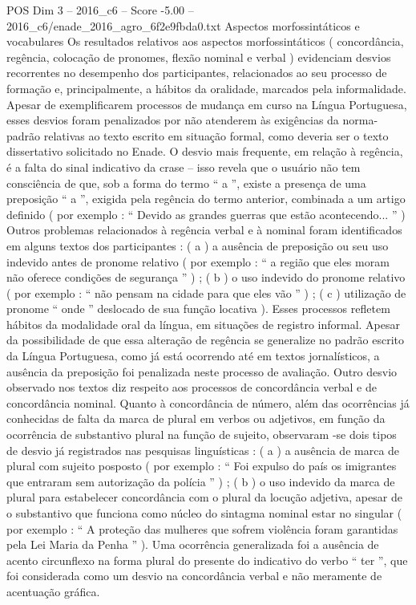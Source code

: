 \begin{textsample}{POS Dim 3 – 2016\_c6 – Score -5.00 – 2016\_c6/enade\_2016\_agro\_6f2e9fbda0.txt}
Aspectos morfossintáticos e vocabulares Os resultados relativos aos aspectos morfossintáticos ( concordância, regência, colocação de pronomes, flexão nominal e verbal ) evidenciam desvios recorrentes no desempenho dos participantes, relacionados ao seu processo de formação e, principalmente, a hábitos da oralidade, marcados pela informalidade.
Apesar de exemplificarem processos de mudança em curso na Língua Portuguesa, esses desvios foram penalizados por não atenderem às exigências da norma-padrão relativas ao texto escrito em situação formal, como deveria ser o texto dissertativo solicitado no Enade.
O desvio mais frequente, em relação à regência, é a falta do sinal indicativo da crase – isso revela que o usuário não tem consciência de que, sob a forma do termo “ a ”, existe a presença de uma preposição “ a ”, exigida pela regência do termo anterior, combinada a um artigo definido ( por exemplo : “ Devido as grandes guerras que estão acontecendo... ” ) Outros problemas relacionados à regência verbal e à nominal foram identificados em alguns textos dos participantes : ( a ) a ausência de preposição ou seu uso indevido antes de pronome relativo ( por exemplo : “ a região que eles moram não oferece condições de segurança ” ) ; ( b ) o uso indevido do pronome relativo ( por exemplo : “ não pensam na cidade para que eles vão ” ) ; ( c ) utilização de pronome “ onde ” deslocado de sua função locativa ).
Esses processos refletem hábitos da modalidade oral da língua, em situações de registro informal.
Apesar da possibilidade de que essa alteração de regência se generalize no padrão escrito da Língua Portuguesa, como já está ocorrendo até em textos jornalísticos, a ausência da preposição foi penalizada neste processo de avaliação.
Outro desvio observado nos textos diz respeito aos processos de concordância verbal e de concordância nominal.
Quanto à concordância de número, além das ocorrências já conhecidas de falta da marca de plural em verbos ou adjetivos, em função da ocorrência de substantivo plural na função de sujeito, observaram -se dois tipos de desvio já registrados nas pesquisas linguísticas : ( a ) a ausência de marca de plural com sujeito posposto ( por exemplo : “ Foi expulso do país os imigrantes que entraram sem autorização da polícia ” ) ; ( b ) o uso indevido da marca de plural para estabelecer concordância com o plural da locução adjetiva, apesar de o substantivo que funciona como núcleo do sintagma nominal estar no singular ( por exemplo : “ A proteção das mulheres que sofrem violência foram garantidas pela Lei Maria da Penha ” ).
Uma ocorrência generalizada foi a ausência de acento circunflexo na forma plural do presente do indicativo do verbo “ ter ”, que foi considerada como um desvio na concordância verbal e não meramente de acentuação gráfica.

\end{textsample}
